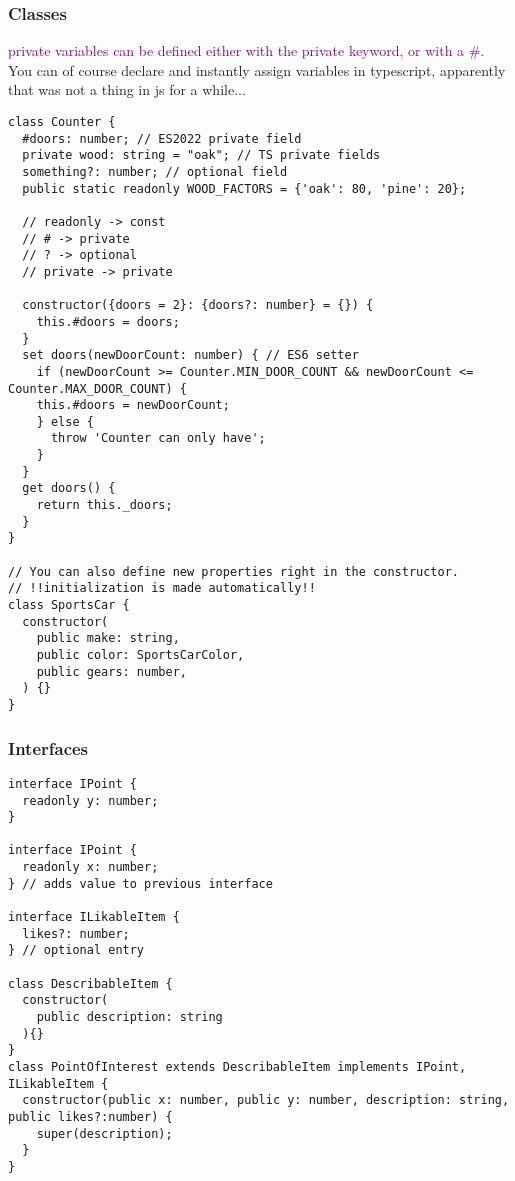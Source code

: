 \documentclass[main.tex,fontsize=8pt,paper=a4,paper=portrait,DIV=calc,]{scrartcl}
\begin{document}
\subsubsection{Classes}
\textcolor{purple}{private variables can be defined either with the private keyword, or with a \#.}\newline
You can of course declare and instantly assign variables in typescript, apparently that was not a thing in js for a while...
\begin{lstlisting}
class Counter {
  #doors: number; // ES2022 private field
  private wood: string = "oak"; // TS private fields
  something?: number; // optional field
  public static readonly WOOD_FACTORS = {'oak': 80, 'pine': 20};

  // readonly -> const
  // # -> private
  // ? -> optional
  // private -> private
  
  constructor({doors = 2}: {doors?: number} = {}) {
    this.#doors = doors;
  }
  set doors(newDoorCount: number) { // ES6 setter
    if (newDoorCount >= Counter.MIN_DOOR_COUNT && newDoorCount <= Counter.MAX_DOOR_COUNT) {
    this.#doors = newDoorCount;
    } else {
      throw 'Counter can only have';
    }
  }
  get doors() {
    return this._doors;
  }
}

// You can also define new properties right in the constructor. 
// !!initialization is made automatically!!
class SportsCar {
  constructor(
    public make: string,
    public color: SportsCarColor,
    public gears: number,
  ) {}
}
\end{lstlisting}

\subsubsection{Interfaces}
\begin{lstlisting}
interface IPoint {
  readonly y: number;
} 

interface IPoint {
  readonly x: number;
} // adds value to previous interface

interface ILikableItem {
  likes?: number;
} // optional entry

class DescribableItem {
  constructor(
    public description: string
  ){}
} 
class PointOfInterest extends DescribableItem implements IPoint, ILikableItem {
  constructor(public x: number, public y: number, description: string, public likes?:number) {
    super(description);
  }
}
\end{lstlisting}
\end{document}
